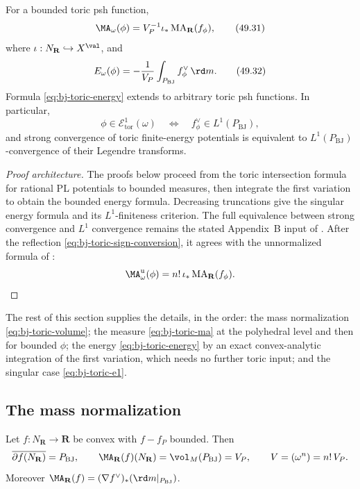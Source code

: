 \begin{theorem}\label{thm:bj-toric-ma-energy}
For a bounded toric psh function,
\[
 \MA_\omega(\phi)=V_P^{-1}\iota_*
             \operatorname{MA}_{\mathbf R}(f_\phi),
\tag{49.31}\label{eq:bj-toric-ma}
\]
where $\iota:N_{\mathbf R}\hookrightarrow X^{\val}$, and
\[
                         E_\omega(\phi)
              =-\frac1{V_P}\int_{P_{\mathrm{BJ}}}f_\phi^\vee\,\rd m.
\tag{49.32}\label{eq:bj-toric-energy}
\]
Formula \eqref{eq:bj-toric-energy} extends to arbitrary toric psh
functions.  In particular,
\[
 \phi\in\mathcal E^1_{\mathrm{tor}}(\omega)
 \quad\Longleftrightarrow\quad
 f_\phi^\vee\in L^1(P_{\mathrm{BJ}}),
\tag{49.33}\label{eq:bj-toric-e1}
\]
and strong convergence of toric finite-energy potentials is equivalent to
$L^1(P_{\mathrm{BJ}})$-convergence of their Legendre transforms.
\end{theorem}

\begin{proof}[Proof architecture]
The proofs below proceed from the toric intersection formula for
rational PL potentials to bounded measures, then integrate the first
variation to obtain the bounded energy formula.  Decreasing truncations
give the singular energy formula and its $L^1$-finiteness criterion.
The full equivalence between strong convergence and $L^1$ convergence
remains the stated Appendix~B input of \cite{BJ22}.
After the reflection
\eqref{eq:bj-toric-sign-conversion}, it agrees with the unnormalized formula
of :
\[
 \MA_\omega^{\mathrm u}(\phi)
       =n!\,\iota_*\operatorname{MA}_{\mathbf R}(f_\phi).
\]
\end{proof}

The rest of this section supplies the details, in the order: the mass
normalization \eqref{eq:bj-toric-volume}; the measure
\eqref{eq:bj-toric-ma} at the polyhedral level and then for bounded
$\phi$; the energy \eqref{eq:bj-toric-energy} by an exact convex-analytic
integration of the first variation, which needs no further toric input; and
the singular case \eqref{eq:bj-toric-e1}.

\subsection{The mass normalization}
\label{sec:ch49-toric-mass}

\begin{samepage}
\begin{lemma}
\label{lem:ch49-toric-volume}
Let $f:N_{\mathbf R}\to\mathbf R$ be convex with $f-f_P$ bounded.
Then
\[
 \overline{\partial f(N_{\mathbf R})}=P_{\mathrm{BJ}},
 \qquad
 \MA_{\mathbf R}(f)(N_{\mathbf R})=\vol_M(P_{\mathrm{BJ}})=V_P,
 \qquad
 V=(\omega^n)=n!\,V_P .
\]
Moreover $\MA_{\mathbf R}(f)=(\nabla f^\vee)_*(\rd m|_{P_{\mathrm{BJ}}})$.
\end{lemma}
\end{samepage}

